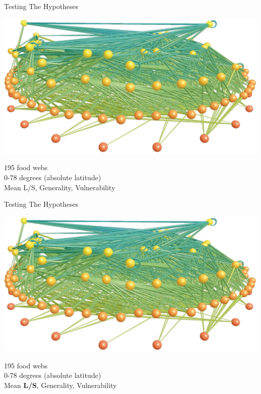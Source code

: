 \documentclass{beamer}
\begin{document}
  \begin{frame}{Testing The Hypotheses}

    \begin{center}
      \includegraphics*[width=.8\textwidth]{Figures/LittleRockLake.eps}


    195 food webs \\
    0-78 degrees (absolute latitude) \\
    Mean L/S, Generality, Vulnerability

    \end{center}

  \end{frame}


  \begin{frame}{Testing The Hypotheses}

    \begin{center}
      \includegraphics*[width=.8\textwidth]{Figures/LittleRockLake.eps}


    195 food webs \\
    0-78 degrees (absolute latitude) \\
    Mean \textbf{L/S}, Generality, Vulnerability

    \end{center}

  \end{frame}
\end{document}

